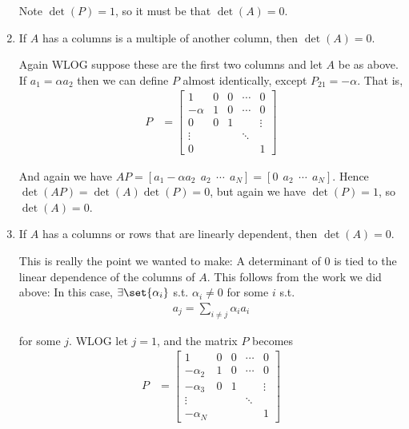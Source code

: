 \documentclass{article}
\begin{document}
\begin{enumerate}
    Note $\det(P) = 1$, so it must be that $\det(A) = 0$.

  \item If $A$ has a columns is a multiple of another column, then $\det(A) = 0$.

    Again WLOG suppose these are the first two columns and let $A$ be as above. If $a_1 = \alpha a_2$ then we can define $P$ almost identically, except $P_{21} = - \alpha$. That is,
    \begin{align*}
      P
      &
      =
      \begin{bmatrix}
        1      & 0 & 0 & \cdots & 0 \\
        -\alpha& 1 & 0 & \cdots & 0 \\
        0      & 0 & 1 &        & \vdots \\
        \vdots &   &   & \ddots &   \\
        0      &   &   &        & 1
      \end{bmatrix}
    \end{align*}

    And again we have $A P = [a_1 - \alpha a_2 ~~ a_2 ~~ \cdots ~~ a_N] = [0 ~~ a_2 ~~ \cdots ~~ a_N]$. Hence $\det(A P) = \det(A) \det(P) = 0$, but again we have $\det(P) = 1$, so $\det(A) = 0$.

  \item If $A$ has a columns or rows that are linearly dependent, then $\det(A) = 0$.

    This is really the point we wanted to make: A determinant of $0$ is tied to the linear dependence of the columns of $A$. This follows from the work we did above: In this case, $\exists \set{\alpha_i}$ s.t. $\alpha_i \ne 0$ for some $i$ s.t.
    \begin{align*}
      a_j = \sum^{}_{i \ne j} \alpha_i a_i
    \end{align*}

    for some $j$. WLOG let $j = 1$, and the matrix $P$ becomes
    \begin{align*}
      P
      &
      =
      \begin{bmatrix}
        1         & 0 & 0 & \cdots & 0 \\
        -\alpha_2 & 1 & 0 & \cdots & 0 \\
        -\alpha_3 & 0 & 1 &        & \vdots \\
        \vdots    &   &   & \ddots & \\
        -\alpha_N &   &   &        & 1
      \end{bmatrix}
    \end{align*}


\end{enumerate}
\end{document}
